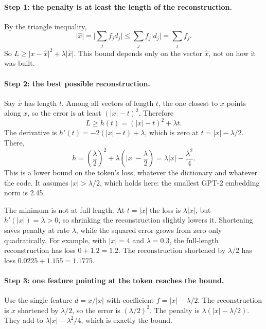 \documentclass[11pt]{article}
\newcommand{\norm}[1]{\lvert #1\rvert}
\begin{document}
\paragraph{Step 1: the penalty is at least the length of the reconstruction.} By the triangle inequality,
\begin{equation}
\norm{\hat{x}} = \Big\lvert \sum_j f_j d_j \Big\rvert \le \sum_j f_j \norm{d_j} = \sum_j f_j .
\end{equation}
So $L \ge \norm{x - \hat{x}}^2 + \lambda\norm{\hat{x}}$. This bound depends only on the vector $\hat{x}$, not on how it was built.

\paragraph{Step 2: the best possible reconstruction.} Say $\hat{x}$ has length $t$. Among all vectors of length $t$, the one closest to $x$ points along $x$, so the error is at least $(\norm{x} - t)^2$. Therefore
\begin{equation}
L \ge h(t) = (\norm{x} - t)^2 + \lambda t .
\end{equation}
The derivative is $h'(t) = -2(\norm{x} - t) + \lambda$, which is zero at $t = \norm{x} - \lambda/2$. There,
\begin{equation}
h = \left(\frac{\lambda}{2}\right)^2 + \lambda\left(\norm{x} - \frac{\lambda}{2}\right) = \lambda\norm{x} - \frac{\lambda^2}{4} .
\end{equation}
This is a lower bound on the token's loss, whatever the dictionary and whatever the code. It assumes $\norm{x} > \lambda/2$, which holds here: the smallest GPT-2 embedding norm is 2.45.

The minimum is not at full length. At $t = \norm{x}$ the loss is $\lambda\norm{x}$, but $h'(\norm{x}) = \lambda > 0$, so shrinking the reconstruction slightly lowers it. Shortening saves penalty at rate $\lambda$, while the squared error grows from zero only quadratically. For example, with $\norm{x} = 4$ and $\lambda = 0.3$, the full-length reconstruction has loss $0 + 1.2 = 1.2$. The reconstruction shortened by $\lambda/2$ has loss $0.0225 + 1.155 = 1.1775$.

\paragraph{Step 3: one feature pointing at the token reaches the bound.} Use the single feature $d = x/\norm{x}$ with coefficient $f = \norm{x} - \lambda/2$. The reconstruction is $x$ shortened by $\lambda/2$, so the error is $(\lambda/2)^2$. The penalty is $\lambda(\norm{x} - \lambda/2)$. They add to $\lambda\norm{x} - \lambda^2/4$, which is exactly the bound.
\end{document}
